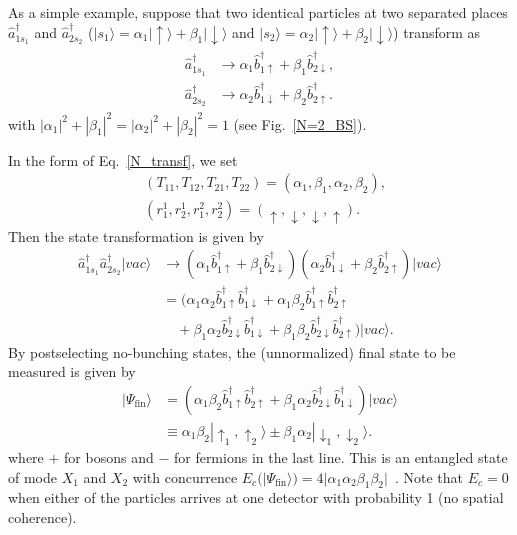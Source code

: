 \documentclass[a4paper,twocolumn,8pt,accepted=2021-12-15]{quantumarticle}
\newcommand{\nn}{\nonumber}
\def\a{\alpha}
\def\b{\beta}
\def\P{\Psi}
\def\>{\rangle}
\def\ha{{\hat{a}}}
\def\hb{{\hat{b}}}
\begin{document}
	
	
	As a simple example, suppose that two identical particles at two separated places $\ha^\dagger_{1s_1}$ and $\ha^\dagger_{2s_2}$ ($|s_1\> = \a_1|\uparrow\> + \b_1|\downarrow\>$ and $|s_2\> = \a_2|\uparrow\> + \b_2|\downarrow\>$) transform as
	\begin{align}
		\begin{split}
			\ha^\dagger_{1s_1} &\to \a_1\hb^\dagger_{1\uparrow} +\b_1\hb^\dagger_{2\downarrow},
			\\
			\ha^\dagger_{2s_2} &\to  \a_2\hb^\dagger_{1\downarrow} +\b_2\hb^\dagger_{2\uparrow}. 
		\end{split}
	\end{align} 
	with $|\a_1|^2 + |\b_1|^2 = |\a_2|^2 + |\b_2|^2 = 1$ (see Fig.~\ref{N=2_BS}). %
 
	In the form of Eq.~\eqref{N_transf}, we set
	\begin{align}\label{N=2_Tr}
		&(T_{11},T_{12},T_{21},T_{22}) = (\a_1,\b_1,\a_2,\b_2), \nn \\ &(r^1_1,r^1_2,r^2_1,r^2_2) = (\uparrow,\downarrow,\downarrow,\uparrow).
	\end{align}  Then the state transformation is given by 
	\begin{align}\label{N=2}
		\ha^\dagger_{1s_1}\ha^\dagger_{2s_2}|vac\> &\to (\a_1\hb^\dagger_{1\uparrow} + \b_1\hb^\dagger_{2\downarrow}) (\a_2\hb^\dagger_{1\downarrow} + \b_2\hb^\dagger_{2\uparrow})|vac\> \nn \\
		&=(\a_1\a_2\hb^\dagger_{1\uparrow}\hb^\dagger_{1\downarrow} +  \a_1\b_2\hb^\dagger_{1\uparrow}\hb^\dagger_{2\uparrow} \nn \\
		&\quad  + \b_1\a_2\hb^\dagger_{2\downarrow}\hb^\dagger_{1\downarrow}+ \b_1\b_2\hb^\dagger_{2\downarrow}\hb^\dagger_{2\uparrow})|vac\>.
	\end{align}
	By postselecting no-bunching states, the (unnormalized) final state to be measured is given by
	\begin{align}\label{N=2_fin}
		|\P_\mathrm{fin}\>&=(\a_1\b_2\hb^\dagger_{1\uparrow}\hb^\dagger_{2\uparrow}+ \b_1\a_2\hb^\dagger_{2\downarrow}\hb^\dagger_{1\downarrow})|vac\> \nn \\
		&\equiv \a_1\b_2|\uparrow_1,\uparrow_2\> \pm \b_1\a_2|\downarrow_1,\downarrow_2\>. 
	\end{align} where $+$ for bosons and $-$ for fermions in the last line. This is an entangled state of mode $X_1$ and $X_2$ with concurrence  $E_c(|\P_\mathrm{fin}\>)=4|\a_1\a_2\b_1\b_2|$~\cite{franco2018indistinguishability,chin2019entanglement,barros:20}. Note that $E_c=0$ when either of the particles arrives at one detector with probability 1 (no spatial coherence).
	
\end{document}
